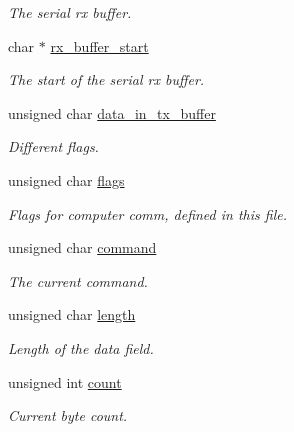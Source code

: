 \begin{CompactItemize}
\begin{CompactList}\small\item\em The serial rx buffer. \item\end{CompactList}\item 
\hypertarget{structcomputer__comm__struct_e9f07bb57356511069eba0f34a598567}{
char $\ast$ \hyperlink{structcomputer__comm__struct_e9f07bb57356511069eba0f34a598567}{rx\_\-buffer\_\-start}}
\label{structcomputer__comm__struct_e9f07bb57356511069eba0f34a598567}

\begin{CompactList}\small\item\em The start of the serial rx buffer. \item\end{CompactList}\item 
\hypertarget{structcomputer__comm__struct_9ba9ab2f309246dcd3aaf0db01b0668d}{
unsigned char \hyperlink{structcomputer__comm__struct_9ba9ab2f309246dcd3aaf0db01b0668d}{data\_\-in\_\-tx\_\-buffer}}
\label{structcomputer__comm__struct_9ba9ab2f309246dcd3aaf0db01b0668d}

\begin{CompactList}\small\item\em Different flags. \item\end{CompactList}\item 
unsigned char \hyperlink{structcomputer__comm__struct_ab774dfbd7ea8cbd5803d7f53dfc916a}{flags}
\begin{CompactList}\small\item\em Flags for computer comm, defined in this file. \item\end{CompactList}\item 
unsigned char \hyperlink{structcomputer__comm__struct_7a513d0a4376dc48e1b912bdb22bd97d}{command}
\begin{CompactList}\small\item\em The current command. \item\end{CompactList}\item 
unsigned char \hyperlink{structcomputer__comm__struct_530bb985c095839ba3634e0642ed3bda}{length}
\begin{CompactList}\small\item\em Length of the data field. \item\end{CompactList}\item 
unsigned int \hyperlink{structcomputer__comm__struct_d652a5eb42fc02f02392840741f09825}{count}
\begin{CompactList}\small\item\em Current byte count. \item\end{CompactList}\end{CompactItemize}


